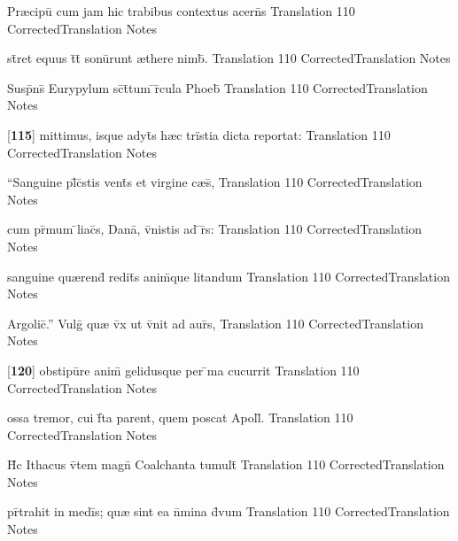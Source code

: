 \latline
  {Pr{\ae}cipu\={} cum jam hic trabibus contextus acern\={\macron {\i}}s}
  { Translation }
  {110}
  { CorrectedTranslation }
  { Notes }


\latline
  {st\={}ret equus t\={}t\={} sonu\={}runt {\ae}there nimb\={\macron {\i}}.}
  { Translation }
  {110}
  { CorrectedTranslation }
  { Notes }


\latline
  {Susp\={}ns\={\macron {\i}} Eurypylum sc\={\macron {\i}}t\={}tum \={}r\={}cula Phoeb\={\macron {\i}}}
  { Translation }
  {110}
  { CorrectedTranslation }
  { Notes }


\latline
  {[\textbf{115}] mittimus, isque adyt\={\macron {\i}}s h{\ae}c tr\"{i}stia dicta reportat:}
  { Translation }
  {110}
  { CorrectedTranslation }
  { Notes }


\latline
  {``Sanguine pl\={}c\={}stis vent\={}s et virgine c{\ae}s\={},}
  { Translation }
  {110}
  { CorrectedTranslation }
  { Notes }


\latline
  {cum pr\={\macron {\i}}mum \={}liac\={}s, Dana\={\macron {\i}}, v\={}nistis ad \={}r\={}s:}
  { Translation }
  {110}
  { CorrectedTranslation }
  { Notes }


\latline
  {sanguine qu{\ae}rend\={\macron {\i}} redit\={}s anim\={}que litandum}
  { Translation }
  {110}
  { CorrectedTranslation }
  { Notes }


\latline
  {Argolic\={}.''  Vulg\={\macron {\i}} qu{\ae} v\={}x ut v\={}nit ad aur\={\macron {\i}}s,}
  { Translation }
  {110}
  { CorrectedTranslation }
  { Notes }


\latline
  {[\textbf{120}] obstipu\={}re anim\={\macron {\i}} gelidusque per \={\macron {\i}}ma cucurrit}
  { Translation }
  {110}
  { CorrectedTranslation }
  { Notes }


\latline
  {ossa tremor, cui f\={}ta parent, quem poscat Apoll\={}.}
  { Translation }
  {110}
  { CorrectedTranslation }
  { Notes }


\latline
  {H\={\macron {\i}}c Ithacus v\={}tem magn\={} Coalchanta tumult\={}}
  { Translation }
  {110}
  { CorrectedTranslation }
  { Notes }


\latline
  {pr\={}trahit in medi\={}s; qu{\ae} sint ea n\={}mina d\={\macron {\i}}vum}
  { Translation }
  {110}
  { CorrectedTranslation }
  { Notes }


